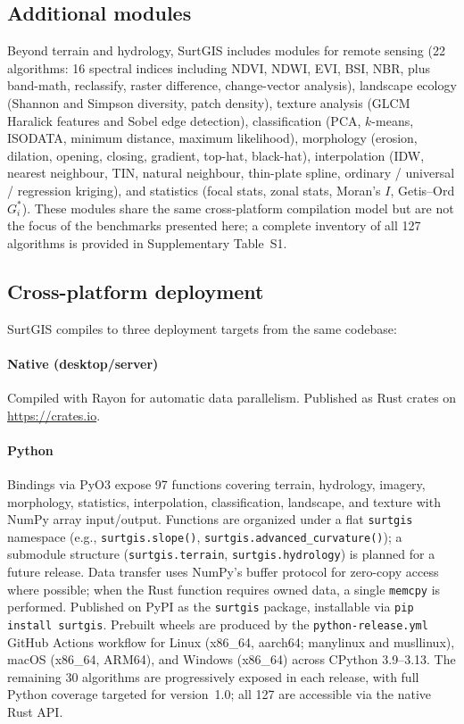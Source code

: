 \documentclass[preprint,review,12pt,authoryear]{elsarticle}
\begin{document}
\subsection{Additional modules}
\label{subsec:additional}

Beyond terrain and hydrology, SurtGIS includes modules for remote sensing (22 algorithms: 16 spectral indices including NDVI, NDWI, EVI, BSI, NBR, plus band-math, reclassify, raster difference, change-vector analysis), landscape ecology (Shannon and Simpson diversity, patch density), texture analysis (GLCM Haralick features and Sobel edge detection), classification (PCA, $k$-means, ISODATA, minimum distance, maximum likelihood), morphology (erosion, dilation, opening, closing, gradient, top-hat, black-hat), interpolation (IDW, nearest neighbour, TIN, natural neighbour, thin-plate spline, ordinary / universal / regression kriging), and statistics (focal stats, zonal stats, Moran's $I$, Getis--Ord $G_i^*$). These modules share the same cross-platform compilation model but are not the focus of the benchmarks presented here; a complete inventory of all 127 algorithms is provided in Supplementary Table~S1.

\subsection{Cross-platform deployment}
\label{subsec:deployment}

SurtGIS compiles to three deployment targets from the same codebase:

\paragraph{Native (desktop/server)} Compiled with Rayon for automatic data parallelism. Published as Rust crates on \url{https://crates.io}.

\paragraph{Python} Bindings via PyO3 \citep{pyo3_2024} expose 97 functions covering terrain, hydrology, imagery, morphology, statistics, interpolation, classification, landscape, and texture with NumPy array input/output. Functions are organized under a flat \texttt{surtgis} namespace (e.g., \texttt{surtgis.slope()}, \texttt{surtgis.advanced\_curvature()}); a submodule structure (\texttt{surtgis.terrain}, \texttt{surtgis.hydrology}) is planned for a future release. Data transfer uses NumPy's buffer protocol for zero-copy access where possible; when the Rust function requires owned data, a single \texttt{memcpy} is performed. Published on PyPI as the \texttt{surtgis} package, installable via \texttt{pip install surtgis}. Prebuilt wheels are produced by the \texttt{python-release.yml} GitHub Actions workflow for Linux (x86\_64, aarch64; manylinux and musllinux), macOS (x86\_64, ARM64), and Windows (x86\_64) across CPython 3.9--3.13. The remaining 30 algorithms are progressively exposed in each release, with full Python coverage targeted for version~1.0; all 127 are accessible via the native Rust API.
\end{document}
